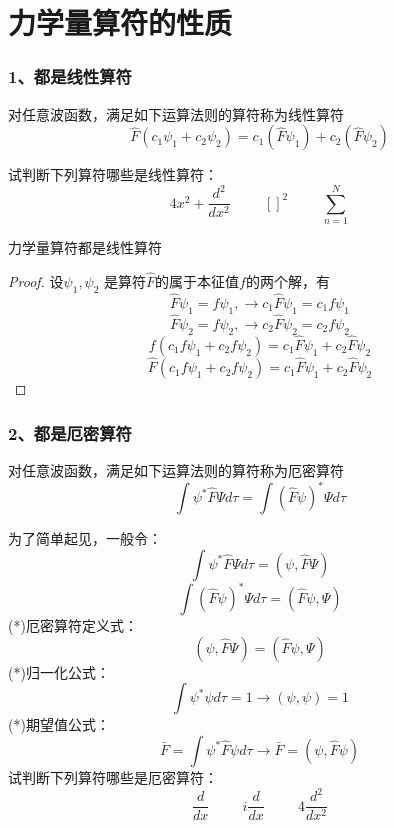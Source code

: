 \section{力学量算符的性质}

\begin{frame} [allowframebreaks=]
    \frametitle{1、都是线性算符}
    \begin{definition}
        对任意波函数，满足如下运算法则的算符称为线性算符\\
        $$\hat{F}(c_1\psi_1+c_2\psi_2 ) = c_1(\hat{F}\psi_1)+c_2(\hat{F}\psi_2 )$$
    \end{definition}
    试判断下列算符哪些是线性算符：\\
    $$4x^2+\frac{d^2}{dx^2} \hspace{1cm}  []^2 \hspace{1cm} \sum\limits_{n=1}^{N}$$
\end{frame} 

\begin{frame} [allowframebreaks=]
    \begin{tcolorbox}[colback=yellow!10,colframe=red!75!black,title=命题]
      力学量算符都是线性算符  
    \end{tcolorbox}
    \begin{proof}
        设$\psi_1, \psi_2$ 是算符$\hat{F}$的属于本征值$f$的两个解，有\\
        $$\hat{F}\psi_1=f\psi_1, \to c_1\hat{F}\psi_1=c_1f\psi_1 $$
        $$\hat{F}\psi_2=f\psi_2, \to c_2\hat{F}\psi_2=c_2f\psi_2 $$
        $$f(c_1f\psi_1+c_2f\psi_2)=c_1\hat{F}\psi_1+c_2\hat{F}\psi_2$$
        $$\hat{F}(c_1f\psi_1+c_2f\psi_2)=c_1\hat{F}\psi_1+c_2\hat{F}\psi_2$$
    \end{proof}
\end{frame} 

\begin{frame} [allowframebreaks=]
    \frametitle{2、都是厄密算符}
    \begin{definition}
    对任意波函数，满足如下运算法则的算符称为厄密算符\\
        $$\int \psi^* \hat{F} \Psi d\tau =\int (\hat{F}\psi)^* \Psi d\tau $$
    \end{definition}
    为了简单起见，一般令： $$\int \psi^* \hat{F} \Psi d\tau= (\psi,\hat{F}\Psi)$$
    $$\int (\hat{F}\psi)^* \Psi d\tau = (\hat{F}\psi,\Psi) $$
    (*)厄密算符定义式： $$(\psi,\hat{F}\Psi)= (\hat{F}\psi,\Psi) $$
    (*)归一化公式： $$ \int \psi^{*} \psi d \tau=1 \to (\psi,\psi)=1$$
    (*)期望值公式： $$ \bar{F}=\int \psi^{*} \hat{F} \psi d \tau \to \bar{F}= (\psi,\hat{F}\psi) $$
    试判断下列算符哪些是厄密算符：\\
    $$\frac{d}{dx} \hspace{1cm}  i\frac{d}{dx} \hspace{1cm} 4\frac{d^2}{dx^2} $$
\end{frame} 

